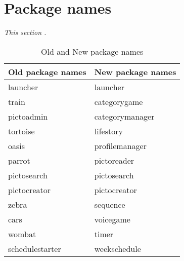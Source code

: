 \section{Package names} \label{Sprint3_name}
\textit{This section .}


\begin{table}
	\centering
	\begin{tabular}{ll}
		\textbf{Old package names} & \textbf{New package names}\\ \hline \noalign{\vskip 2mm}
		launcher & launcher\\ \hline
		train & categorygame\\ \hline
		pictoadmin & categorymanager\\ \hline
		tortoise & lifestory\\ \hline
		oasis & profilemanager\\ \hline
		parrot & pictoreader\\ \hline
		pictosearch & pictosearch\\ \hline
		pictocreator & pictocreator\\ \hline
		zebra & sequence\\ \hline
		cars & voicegame\\ \hline
		wombat & timer\\ \hline
		schedulestarter & weekschedule\\ \hline
		
	\end{tabular}
	\caption{Old and New package names}
	\label{Sprint3_package_names_apps}
\end{table}
